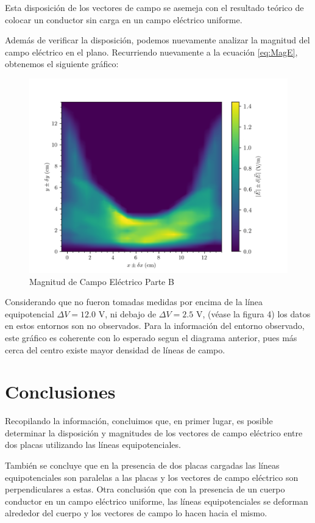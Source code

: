 \documentclass{article}
\begin{document}
Esta disposición de los vectores de campo se asemeja con el resultado teórico de colocar un conductor sin carga en un campo eléctrico uniforme.

Además de verificar la disposición, podemos nuevamente analizar la magnitud del campo eléctrico en el plano. Recurriendo nuevamente a la ecuación \ref{eq:MagE}, obtenemos el siguiente gráfico:

\begin{figure}[H]
  \hspace{-0.1cm}\includegraphics[scale=0.12]{plot3.png}
  \caption{Magnitud de Campo Eléctrico Parte B}
\end{figure}

Considerando que no fueron tomadas medidas por encima de la línea equipotencial $\Delta V = 12.0$ V, ni debajo de $\Delta V = 2.5$ V, (véase la figura 4) los datos en estos entornos son no observados. Para la información del entorno observado, este gráfico es coherente con lo esperado segun el diagrama anterior, pues más cerca del centro existe mayor densidad de líneas de campo.

\section{Conclusiones}

Recopilando la información, concluimos que, en primer lugar, es posible determinar la disposición y magnitudes de los vectores de campo eléctrico entre dos placas utilizando las líneas equipotenciales. 

También se concluye que en la presencia de dos placas cargadas las líneas equipotenciales son paralelas a las placas y los vectores de campo eléctrico son perpendiculares a estas. Otra conclusión que con la presencia de un cuerpo conductor en un campo eléctrico uniforme, las líneas equipotenciales se deforman alrededor del cuerpo y los vectores de campo lo hacen hacia el mismo.
\end{document}
